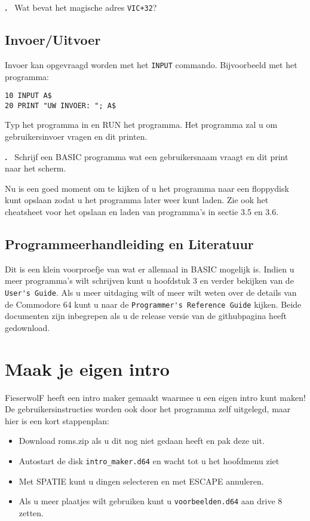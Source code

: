 \documentclass{article}
\newcounter{problem}
\newcounter{solution}
\newcommand\problem{%
  \stepcounter{problem}%
  \textbf{\theproblem.}~%
  \setcounter{solution}{0}%
}
\begin{document}
\problem Wat bevat het magische adres \verb:VIC+32:?

\subsection{Invoer/Uitvoer}

Invoer kan opgevraagd worden met het \verb:INPUT: commando.
Bijvoorbeeld met het programma:

\begin{lstlisting}
10 INPUT A$
20 PRINT "UW INVOER: "; A$
\end{lstlisting}

Typ het programma in en RUN het programma.
Het programma zal u om gebruikersinvoer vragen en dit printen.

\problem Schrijf een BASIC programma wat een gebruikersnaam vraagt en dit print naar het scherm.

Nu is een goed moment om te kijken of u het programma naar een floppydisk kunt opslaan zodat u het programma later weer kunt laden.
Zie ook het cheatsheet voor het opslaan en laden van programma's in sectie 3.5 en 3.6.

\subsection{Programmeerhandleiding en Literatuur}

Dit is een klein voorproefje van wat er allemaal in BASIC mogelijk is.
Indien u meer programma's wilt schrijven kunt u hoofdstuk 3 en verder bekijken van de \verb:User's Guide:.
Als u meer uitdaging wilt of meer wilt weten over de details van de Commodore 64 kunt u naar de \verb:Programmer's Reference Guide: kijken.
Beide documenten zijn inbegrepen als u de release versie van de githubpagina heeft gedownload.

\section{Maak je eigen intro}
FieserwolF heeft een intro maker gemaakt waarmee u een eigen intro kunt maken!
De gebruikersinstructies worden ook door het programma zelf uitgelegd, maar hier is een kort stappenplan:

\begin{itemize}
	\item Download roms.zip als u dit nog niet gedaan heeft en pak deze uit.
	\item Autostart de disk \verb:intro_maker.d64: en wacht tot u het hoofdmenu ziet
	\item Met SPATIE kunt u dingen selecteren en met ESCAPE annuleren.
	\item Als u meer plaatjes wilt gebruiken kunt u \verb:voorbeelden.d64: aan drive 8 zetten.
\end{itemize}
\end{document}
